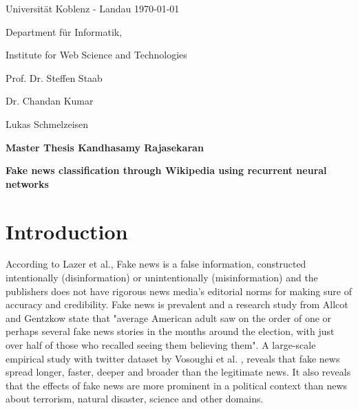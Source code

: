 \documentclass[a4paper, 11pt]{article}
\newcommand{\myName}{Kandhasamy Rajasekaran}
\newcommand{\Title}{Fake news classification through Wikipedia using recurrent neural networks}
\newcommand{\subject}{Institute for Web Science and Technologies}
\newcommand{\expert}{Prof. Dr. Steffen Staab}%
\newcommand{\supervisor}{Dr. Chandan Kumar} %
\newcommand{\secondSupervisor}{Lukas Schmelzeisen} %
\newcommand{\type}{Master Thesis}
\begin{document}
Universit\"{a}t Koblenz - Landau \hfill \today

Department f\"{u}r Informatik,

\subject{}

\expert{}

\supervisor{}

\secondSupervisor{}

\begin{center}
	\large{\bf \type{}  \myName{}}

	\vspace*{0.5cm}

	\large{\bf \Title}
\end{center}

\setlength{\parskip}{1.5ex plus0.5ex minus 0.5ex}
\begin{abstract}
\frenchspacing
\noindent
The unprecedented growth in production and dissemination of information leads to an unprecedented growth in production and dissemination of fake news. Fake news hinders the society from progress by deterring the pursuit of true information. It is very essential to have a mechanism to detect and control fake news. Several attempts have been made which uses platform specific features, collaborative efforts of domain experts to control fake news. This research work will use wikipedia as a ground reality and cross check claims automatically. Recurrent neural networks will be used to understand wikipedia along with multiple novel ways to build false news. The performance of different configurations of neural networks will be analyzed and benchmarked against each other.
\end{abstract}
\section{Introduction}
\frenchspacing

According to Lazer et al.\cite{Lazer1094}, Fake news is a false information, constructed intentionally (disinformation) or unintentionally (misinformation) and the publishers does not have rigorous news media's editorial norms for making sure of accuracy and credibility. Fake news is prevalent and a research study from Allcot and Gentzkow \cite{Allcott2017} state that "average American adult saw on the order of one or perhaps several fake news stories in the months around the election, with just over half of those who recalled seeing them believing them". A large-scale empirical study with twitter dataset by Vosoughi et al. \cite{Vosoughi1146}, reveals that fake news spread longer, faster, deeper and broader than the legitimate news. It also reveals that the effects of fake news are more prominent in a political context than news about terrorism, natural disaster, science and other domains.
\end{document}
